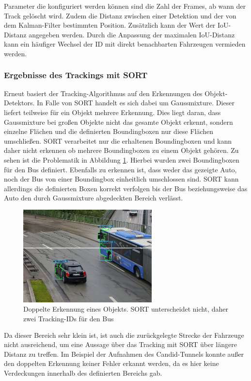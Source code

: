 \documentclass[conference]{IEEEtran}
\begin{document}
	Parameter die konfiguriert werden können sind die Zahl der Frames, ab wann der
	Track gelöscht wird. Zudem die Distanz zwischen einer Detektion und der von dem
	Kalman-Filter bestimmten Position. Zusätzlich kann der Wert der IoU-Distanz angegeben werden.
	Durch die Anpassung der maximalen IoU-Distanz
	kann ein häufiger Wechsel der ID mit direkt benachbarten Fahrzeugen vermieden werden.
	
	\subsubsection{Ergebnisse des Trackings mit SORT}
	Erneut basiert der Tracking-Algorithmus auf den Erkennungen des Objekt-Detektors. In Falle von SORT handelt es sich dabei um Gaussmixture. Dieser liefert teilweise für ein Objekt mehrere Erkennung. Dies liegt daran, dass Gaussmixture bei großen Objekte nicht das gesamte Objekt erkennt, sondern einzelne Flächen und die definierten Boundingboxen nur diese Flächen umschließen. SORT verarbeitet nur die erhaltenen Boundingboxen und kann daher nicht erkennen ob mehrere Boundingboxen zu einem Objekt gehören. Zu sehen ist die Problematik in Abbildung \ref{sortdouble}. Hierbei wurden zwei Boundingboxen für den Bus definiert. Ebenfalls zu erkennen ist, dass weder das gezeigte Auto, noch der Bus von einer Boundingbox einheitlich umschlossen sind. SORT kann allerdings die definierten Boxen korrekt verfolgen bis der Bus beziehungsweise das Auto den durch Gaussmixture abgedeckten Bereich verlässt. 
	
	\begin{figure}[!h]
		\begin{center}
			\includegraphics[width=7cm]{Media/sortdouble.jpg}
			\caption{Doppelte Erkennung eines Objekts. SORT unterscheidet nicht, daher zwei Tracking-IDs für den Bus}
			\label{sortdouble}
		\end{center}
	\end{figure}

	Da dieser Bereich sehr klein ist, ist auch die zurückgelegte Strecke der Fahrzeuge nicht ausreichend, um eine Aussage über das Tracking mit SORT über längere Distanz zu treffen. 
	Im Beispiel der Aufnahmen des Candid-Tunnels konnte außer den doppelten Erkennung keiner Fehler erkannt werden, da es hier keine Verdeckungen innerhalb des definierten Bereichs gab.
	
\end{document}
